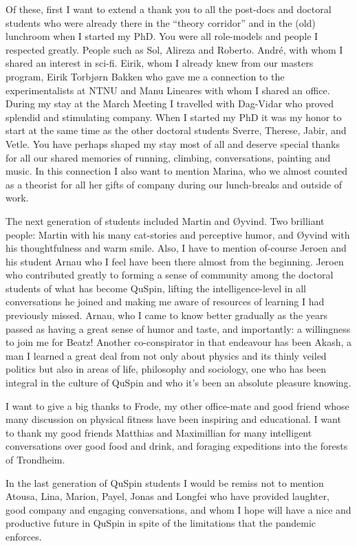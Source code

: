 Of these, first I want to extend a thank you to all the post-docs and doctoral students who were already there in the ``theory corridor'' and in the
(old) lunchroom when I started my PhD. You were all
role-models and people I respected greatly. People such as Sol, Alireza and Roberto. Andr\'e, with whom I shared an interest in sci-fi. Eirik,
whom I already knew from our masters program, Eirik Torbjørn Bakken who gave me a connection to the experimentalists at NTNU and Manu Lineares
with whom I shared an office. During my stay at the March Meeting I travelled with Dag-Vidar who proved splendid and
stimulating company.
When I started my PhD it was my honor to start at the same time as the other doctoral students Sverre, Therese, Jabir, and Vetle.
You have perhaps shaped my stay most of all and deserve special thanks for all our shared memories of running, climbing,
conversations, painting and music. In this connection I also want to mention Marina, who we almost counted as a theorist
for all her gifts of company during our lunch-breaks and outside of work.

The next generation of students included Martin and Øyvind. Two brilliant people: Martin with his many cat-stories and
perceptive humor, and Øyvind with his thoughtfulness and warm smile. Also, I have to mention of-course Jeroen and his student
Arnau who I feel have been there almost from the beginning. Jeroen who contributed greatly to forming a sense
of community among the doctoral students of what has become QuSpin, lifting the intelligence-level in all conversations
he joined and making me aware of resources of learning I had previously missed. Arnau, who I came to know better gradually as the
years passed as having a great sense of humor and taste, and importantly: a willingness to join me for Beatz! Another
co-conspirator in that endeavour has been Akash, a man I learned a great deal from not only about physics and its
thinly veiled politics but also in areas of life, philosophy and sociology, one who has been integral in the culture
of QuSpin and who it's been an absolute pleasure knowing.

I want to give a big thanks to Frode, my other office-mate and good friend whose many discussion on physical fitness
have been inspiring and educational. I want to thank my good friends Matthias and Maximillian for many intelligent
conversations over good food and drink, and foraging expeditions into the forests of Trondheim.

In the last generation of QuSpin students I would be remiss not to mention Atousa, Lina, Marion, Payel, Jonas and Longfei
who have provided laughter, good company and engaging conversations, and whom I hope will have a
nice and productive future in QuSpin in spite of the limitations that the pandemic enforces.

